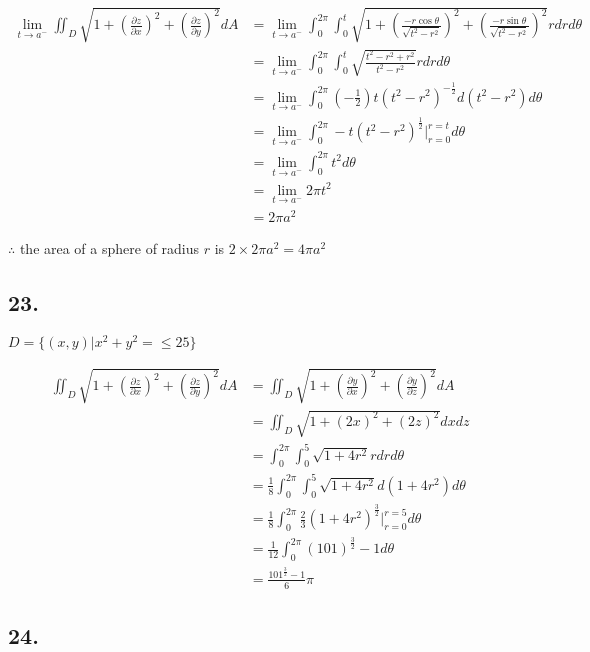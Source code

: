 \documentclass{article}
\begin{document}
  $$\begin{aligned}
    \lim_{t \to a^-} \iint_D \sqrt{1 + (\frac{\partial z}{\partial x})^2 + (\frac{\partial z}{\partial y})^2} dA &= \lim_{t \to a^-} \int_0^{2\pi} \int_0^t \sqrt{1 + (\frac{-r\cos \theta}{\sqrt{t^2 - r^2}})^2 + (\frac{-r\sin \theta}{\sqrt{t^2-r^2}})^2} r dr d\theta \\
    &= \lim_{t \to a^-} \int_0^{2\pi} \int_0^t \sqrt{\frac{t^2-r^2 + r^2}{t^2-r^2}} r dr d\theta \\
    &= \lim_{t \to a^-} \int_0^{2\pi} (-\frac 1 2) t (t^2 - r^2)^{-\frac 1 2} d(t^2 - r^2) d\theta \\
    &= \lim_{t \to a^-} \int_0^{2\pi} -t(t^2-r^2)^{\frac 1 2}\biggl|_{r=0}^{r=t} d\theta \\
    &= \lim_{t \to a^-} \int_0^{2\pi} t^2 d\theta \\
    &= \lim_{t \to a^-} 2\pi t^2 \\
    &= 2\pi a^2
  \end{aligned}$$

  $\therefore$ the area of a sphere of radius $r$ is $2 \times 2\pi a^2 = 4\pi a^2$

  \subsection*{23. }

  $D = \{ (x, y) | x^2 + y^2 = \leq 25 \}$

  $$\begin{aligned}
    \iint_D \sqrt{1 + (\frac{\partial z}{\partial x})^2 + (\frac{\partial z}{\partial y})^2} dA &= \iint_D \sqrt{1 + (\frac{\partial y}{\partial x})^2 + (\frac{\partial y}{\partial z})^2} dA \\
    &= \iint_D \sqrt{1 + (2x)^2 + (2z)^2} dx dz \\
    &= \int_0^{2\pi} \int_0^5 \sqrt{1 + 4r^2} r dr d\theta \\
    &= \frac 1 8 \int_0^{2\pi} \int_0^5 \sqrt{1 + 4r^2} d(1 + 4r^2) d\theta \\
    &= \frac 1 8 \int_0^{2\pi} \frac 2 3 (1 + 4r^2)^{\frac 3 2}\biggl|_{r=0}^{r=5} d\theta \\
    &= \frac {1}{12} \int_0^{2\pi} (101)^{\frac 3 2} - 1 d\theta \\
    &= \frac{101^{\frac 3 2} - 1}{6} \pi
  \end{aligned}$$

  \subsection*{24. }
\end{document}
